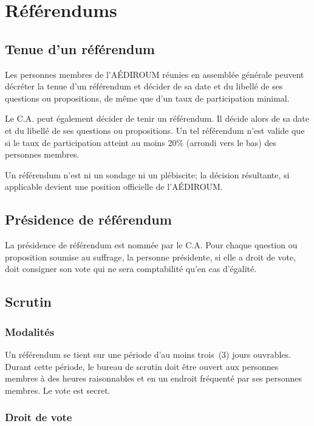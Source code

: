 \documentclass{aediroum}
\begin{document}
\section{Référendums}\label{sec:referendums}
\subsection{Tenue d'un référendum}\label{sec:tenue-dun-referendum}
Les personnes membres de l'AÉDIROUM réunies en assemblée générale peuvent décréter la tenue d'un référendum et décider de sa date et du libellé de ses questions ou propositions, de même que d'un taux de participation minimal.

Le C.A. peut également décider de tenir un référendum. Il décide alors de sa date et du libellé de ses questions ou propositions. Un tel référendum n'est valide que si le taux de participation atteint au moins 20\% (arrondi vers le bas) des personnes membres.

Un référendum n'est ni un sondage ni un plébiscite; la décision résultante, si applicable devient une position officielle de l'AÉDIROUM.

\subsection{Présidence de référendum}\label{sec:president-de-referendum}
La présidence de référendum est nommée par le C.A. Pour chaque question ou proposition soumise au suffrage, la personne présidente, si elle a droit de vote, doit consigner son vote qui ne sera comptabilité qu'en cas d'égalité.

\subsection{Scrutin}\label{sec:scrutin}
\subsubsection{Modalités}\label{sec:modalites-scrutin}

Un référendum se tient sur une période d'au moins trois~(3) jours ouvrables. Durant cette période, le bureau de scrutin doit être ouvert aux personnes membres à des heures raisonnables et en un endroit fréquenté par ses personnes membres. Le vote est secret.

\subsubsection{Droit de vote}\label{sec:droit-de-vote}
\end{document}
